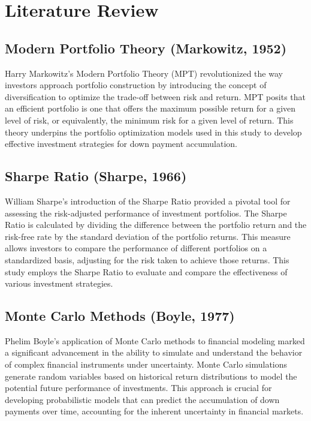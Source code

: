 \section{Literature Review}
\subsection{Modern Portfolio Theory (Markowitz, 1952)}
Harry Markowitz’s Modern Portfolio Theory (MPT) revolutionized the way investors approach portfolio construction by introducing the concept of diversification to optimize the trade-off between risk and return. MPT posits that an efficient portfolio is one that offers the maximum possible return for a given level of risk, or equivalently, the minimum risk for a given level of return. This theory underpins the portfolio optimization models used in this study to develop effective investment strategies for down payment accumulation.

\subsection{Sharpe Ratio (Sharpe, 1966)}
William Sharpe’s introduction of the Sharpe Ratio provided a pivotal tool for assessing the risk-adjusted performance of investment portfolios. The Sharpe Ratio is calculated by dividing the difference between the portfolio return and the risk-free rate by the standard deviation of the portfolio returns. This measure allows investors to compare the performance of different portfolios on a standardized basis, adjusting for the risk taken to achieve those returns. This study employs the Sharpe Ratio to evaluate and compare the effectiveness of various investment strategies.

\subsection{Monte Carlo Methods (Boyle, 1977)}
Phelim Boyle’s application of Monte Carlo methods to financial modeling marked a significant advancement in the ability to simulate and understand the behavior of complex financial instruments under uncertainty. Monte Carlo simulations generate random variables based on historical return distributions to model the potential future performance of investments. This approach is crucial for developing probabilistic models that can predict the accumulation of down payments over time, accounting for the inherent uncertainty in financial markets.


